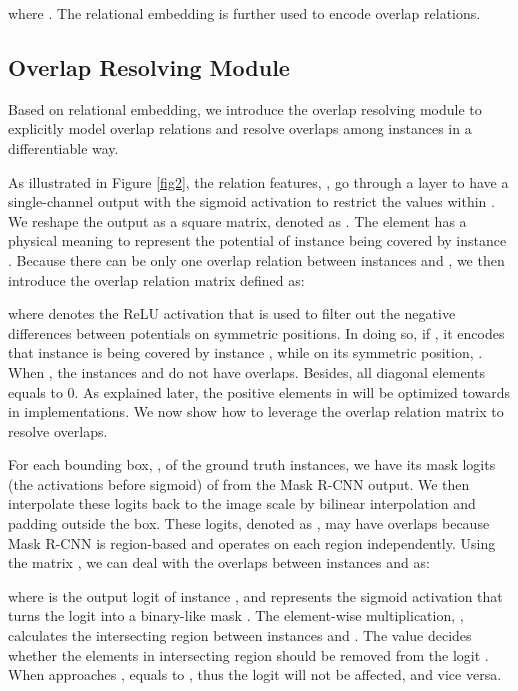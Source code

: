\documentclass[letterpaper]{article} \usepackage{aaai20}  \usepackage{times}  \usepackage{helvet} \usepackage{courier}  \usepackage[hyphens]{url}  \usepackage{graphicx} \urlstyle{rm} \def\UrlFont{\rm}  \usepackage{graphicx}  \frenchspacing  \setlength{\pdfpagewidth}{8.5in}  \setlength{\pdfpageheight}{11in}
\begin{document}
where . The relational embedding is further used to encode overlap relations. 






\subsection{Overlap Resolving Module}


Based on relational embedding, we introduce the overlap resolving module to explicitly model overlap relations and resolve overlaps among instances in a differentiable way. 

As illustrated in Figure \ref{fig2}, the relation features, , go through a  layer to have a single-channel output with the sigmoid activation to restrict the values within . We reshape the output as a square matrix, denoted as . The element  has a physical meaning to represent the potential of instance  being covered by instance . Because there can be only one overlap relation between instances  and , we then introduce the overlap relation matrix defined as:

where  denotes the ReLU activation that is used to filter out the negative differences between potentials on symmetric positions. In doing so, if , it encodes that instance  is being covered by instance , while on its symmetric position, . When , the instances  and  do not have overlaps. Besides, all diagonal elements  equals to 0. As explained later, the positive elements in  will be optimized towards  in implementations. We now show how to leverage the overlap relation matrix  to resolve overlaps. 

For each bounding box, , of the ground truth instances, we have its mask logits (the activations before sigmoid) of  from the Mask R-CNN output. We then interpolate these logits back to the image scale  by bilinear interpolation and padding outside the box. These logits, denoted as , may have overlaps because Mask R-CNN is region-based and operates on each region independently. Using the matrix , we can deal with the overlaps between instances  and  as:

where  is the output logit of instance , and  represents the sigmoid activation that turns the logit  into a binary-like mask . The element-wise multiplication, , calculates the intersecting region between instances  and . The value  decides whether the elements in intersecting region should be removed from the logit . When  approaches ,  equals to , thus the logit  will not be affected, and vice versa. 
\end{document}
